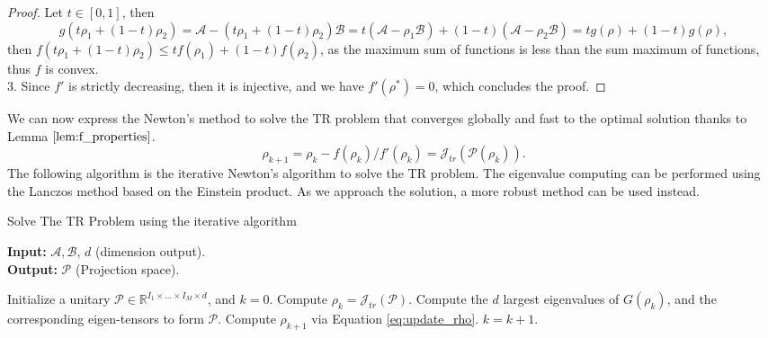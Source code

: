 \documentclass{siamltex}
\begin{document}
\begin{proof}
Let $t \in [0,1]$, then
\begin{equation*}
g(t\rho_1+(1-t)\rho_2)=\mathcal{A} - (t\rho_1+(1-t)\rho_2) \mathcal{B} = t(\mathcal{A} - \rho_1 \mathcal{B}) + (1-t)(\mathcal{A} - \rho_2 \mathcal{B})= t g(\rho) + (1-t) g(\rho),
\end{equation*}
then $f(t\rho_1+(1-t)\rho_2) \leq t f(\rho_1) + (1-t) f(\rho_2)$, as the maximum sum of functions is less than the sum maximum of functions, thus $f$ is convex.\\
$3.$ Since $f'$ is strictly decreasing, then it is injective, and we have $f'(\rho^*)=0$, which concludes the proof.
\end{proof}

\noindent
We can now express the Newton's method to solve the TR problem that converges globally and fast to the optimal solution thanks to Lemma $\ref{lem:f_properties}$.
\begin{equation}\label{eq:update_rho}
\rho_{k+1}=\rho_k - f(\rho_k)/f'(\rho_k)=\mathcal{J}_{tr}(\mathcal{P}(\rho_k)).
\end{equation}
The following algorithm is the iterative Newton's algorithm to solve the TR problem. The eigenvalue computing can be performed using the Lanczos method based on the Einstein product. As we approach the solution, a more robust method can be used instead.

\begin{algorithm}[H]
\caption{Solve The TR Problem using the iterative algorithm}
\hspace*{\algorithmicindent} \textbf{Input:} $\mathcal{A},\mathcal{B}$, $d$ (dimension output).\\
\hspace*{\algorithmicindent} \textbf{Output:} $\mathcal{P}$ (Projection space).
\begin{algorithmic}[1]
\State Initialize a unitary $\mathcal{P} \in \mathbb{R}^{I_1 \times \ldots \times I_M \times d}$, and $k=0$.
\State Compute $\rho_k=\mathcal{J}_{tr}(\mathcal{P})$.
\State Compute the $d$ largest eigenvalues of $G(\rho_k)$, and the corresponding eigen-tensors to form $\mathcal{P}$. 
\State Compute $\rho_{k+1}$ via Equation \ref{eq:update_rho}.
\State $k=k+1$.
\EndWhile
\end{algorithmic}
\label{alg:TR_iterative}
\end{algorithm}
\end{document}
